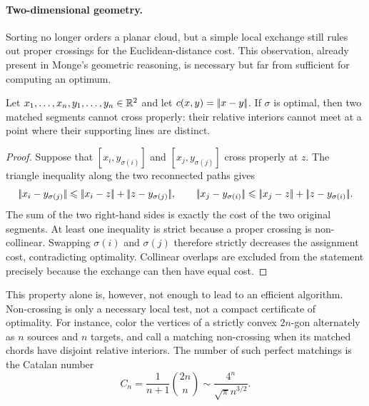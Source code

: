 \paragraph{Two-dimensional geometry.}

Sorting no longer orders a planar cloud, but a simple local exchange still rules out proper crossings for the Euclidean-distance cost. This observation, already present in Monge's geometric reasoning, is necessary but far from sufficient for computing an optimum.

\begin{proposition}\label{prop-planar-no-proper-crossing}
	Let $x_1,\ldots,x_n,y_1,\ldots,y_n\in\mathbb{R}^2$ and let $c(x,y)=|\!| x-y |\!|$. If $\sigma$ is optimal, then two matched segments cannot cross properly: their relative interiors cannot meet at a point where their supporting lines are distinct.
\end{proposition}

\begin{proof}
	Suppose that $[x_i,y_{\sigma(i)}]$ and $[x_j,y_{\sigma(j)}]$ cross properly at $z$. The triangle inequality along the two reconnected paths gives
		\[
			\norm{x_i-y_{\sigma(j)}}
			\leq
			\norm{x_i-z}+\norm{z-y_{\sigma(j)}}
			,\qquad
			\norm{x_j-y_{\sigma(i)}}
			\leq
			\norm{x_j-z}+\norm{z-y_{\sigma(i)}}.
	\]
	The sum of the two right-hand sides is exactly the cost of the two original segments. At least one inequality is strict because a proper crossing is non-collinear. Swapping $\sigma(i)$ and $\sigma(j)$ therefore strictly decreases the assignment cost, contradicting optimality. Collinear overlaps are excluded from the statement precisely because the exchange can then have equal cost.
\end{proof}

This property alone is, however, not enough to lead to an efficient algorithm. Non-crossing is only a necessary local test, not a compact certificate of optimality. For instance, color the vertices of a strictly convex $2n$-gon alternately as $n$ sources and $n$ targets, and call a matching non-crossing when its matched chords have disjoint relative interiors. The number of such perfect matchings is the Catalan number
\[
	C_n=\frac{1}{n+1}\binom{2n}{n}\sim \frac{4^n}{\sqrt{\pi}n^{3/2}}.
\]

